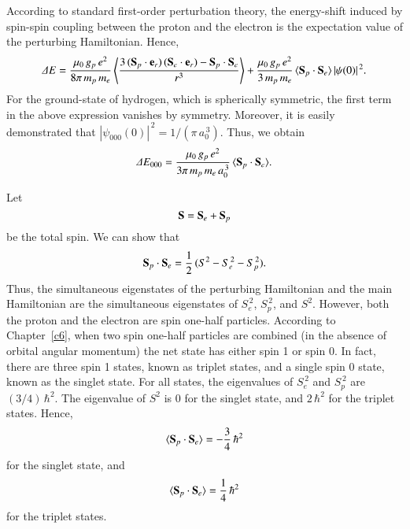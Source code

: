 According to standard first-order perturbation theory, the energy-shift induced
by spin-spin coupling between the proton and the electron is the expectation
value of the perturbing Hamiltonian. Hence,
\begin{equation}
{\mit\Delta} E = \frac{\mu_0\,g_p\,e^2}{8\pi\,m_p\,m_e}\left\langle\frac{3\,({\bf S}_p\cdot{\bf e}_r)\,({\bf S}_e\cdot{\bf e}_r) - {\bf S}_p\cdot{\bf S}_e}{r^3}\right\rangle+ \frac{\mu_0\,g_p\,e^2}{3\,m_p\,m_e}\,\langle{\bf S}_p\cdot{\bf S}_e\rangle\,|\psi(0)|^{\,2}.
\end{equation}
For the ground-state of hydrogen, which is spherically symmetric,
the first term in the above expression vanishes by symmetry. 
Moreover, it is easily demonstrated that $|\psi_{000}(0)|^{\,2}=
1/(\pi\,a_0^{\,3})$. Thus, we obtain
\begin{equation}
{\mit\Delta} E_{000} = \frac{\mu_0\,g_p\,e^2}{3\pi\,m_p\,m_e\,a_0^{\,3}}\,\langle{\bf S}_p\cdot{\bf S}_e\rangle.
\end{equation}

Let
\begin{equation}
{\bf S} = {\bf S}_e + {\bf S}_p
\end{equation}
be the total spin. We can show that
\begin{equation}
{\bf S}_p\cdot{\bf S}_e = \frac{1}{2}\,(S^2-S_e^{\,2}-S_p^{\,2}).
\end{equation}
Thus, the simultaneous eigenstates of the perturbing Hamiltonian
and the main Hamiltonian are the simultaneous eigenstates of $S_e^{\,2}$,
$S_p^{\,2}$, and $S^2$. However, both the proton and
the electron are spin one-half particles. According to Chapter~\ref{c6},
when two spin one-half particles are combined (in the absence of orbital
angular momentum) the net state  has either spin 1 or spin 0.
In fact, there are three spin 1 states, known as triplet states, and a single
spin 0 state, known as the singlet state. For all states,
the eigenvalues of $S_e^{\,2}$ and $S_p^{\,2}$ are $(3/4)\,\hbar^2$.
The eigenvalue of $S^2$ is 0 for the singlet state, and $2\,\hbar^2$
for the triplet states. Hence,
\begin{equation}
\langle {\bf S}_p\cdot{\bf S}_e\rangle = - \frac{3}{4}\,\hbar^2
\end{equation}
for the singlet state, and
\begin{equation}
\langle {\bf S}_p\cdot{\bf S}_e\rangle =  \frac{1}{4}\,\hbar^2
\end{equation}
for the triplet states. 

